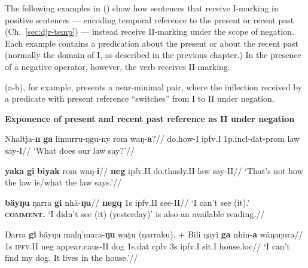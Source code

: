 The following examples in () show how sentences that receive \gls{I}-marking in positive sentences --- encoding temporal reference to the present or recent past (Ch.~\ref{sec:djr-temp}) --- instead receive \gls{II}-marking under the scope of negation. Each example contains a predication about the present or about the recent past (normally the domain of \gls{I}, as described in the previous chapter.) In the presence of a negative operator, however, the verb receives \gls{II}-marking. 

(a-b), for example, presents a near-minimal pair, where the inflection received by a predicate with present reference ``switches'' from \gls{I} to \gls{II} under negation.

\pex\textbf{Exponence of present and recent past reference as \gls{II} under negation}


\a\begingl%
\gla Nhaltja-\textbf{n} \textbf{ga} limurru-ŋgu-ny rom waŋ-\textbf{a}?//
\glb do.how-\gls{I} \gls{ipfv}.\gls{I} 1p.\gls{incl}-\gls{dat}-\gls{prom} law say-\gls{I}//
\glft`What does our law say?'//\endgl

\a\begingl%
\gla \textbf{yaka} \textbf{gi} \textbf{biyak} rom waŋ-\textbf{i}//
\glb \textbf{\gls{neg}} \gls{ipfv}.\gls{II} do.thusly.\gls{II} law say-\gls{II}//
\glft`That's not how the law is/what the law says.'//\endgl 




\a\begingl%
\gla \textbf{bäyŋu} ŋarra \textbf{gi} nhä-\textbf{ŋu}//
\glb \textbf{\gls{negq}} 1s \gls{ipfv}.\gls{II} see-\gls{II}//
\glft`I can't see (it).'\\
\textsc{\textbf{comment.}} `I didn't see (it) (yesterday)' is also an available reading.\trailingcitation{[AW 2018030]}//\endgl



\a\begingl\gla Ŋarra \textbf{gi} bäyŋu maḻŋ'mara-\textbf{ŋu} waṯu (ŋarraku). + Bili ŋayi \textbf{ga} nhin-\textbf{a} wäŋaŋura//
\glb 1s \textsc{ipfv}.II \gls{neg} appear.\gls{caus}-\gls{II} dog 1s.\gls{dat} \gls{cplv} 3s \gls{ipfv}.\gls{I} sit.\gls{I} house.\gls{loc}//
\glft`I can't find my dog. It lives in the house.'\trailingcitation{[DhG~20190417]}//\endgl



